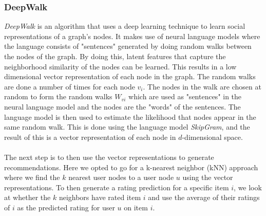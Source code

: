\subsubsection{DeepWalk}
\textit{DeepWalk} is an algorithm that uses a deep learning technique to learn social representations of a graph's nodes\cite{DeepWalk}.
It makes use of neural language models where the language consists of "sentences" generated by doing random walks between the nodes of the graph.
By doing this, latent features that capture the neighborhood similarity of the nodes can be learned.
This results in a low dimensional vector representation of each node in the graph.
The random walks are done a number of times for each node $v_i$.
The nodes in the walk are chosen at random to form the random walks $W_{vi}$ which are used as "sentences" in the neural language model and the nodes are the "words" of the sentences.
The language model is then used to estimate the likelihood that nodes appear in the same random walk.
This is done using the language model \textit{SkipGram}, and the result of this is a vector representation of each node in $d$-dimensional space.
\\\\
The next step is to then use the vector representations to generate recommendations.
Here we opted to go for a k-nearest neighbor (kNN) approach where we find the $k$ nearest user nodes to a user node $u$ using the vector representations.
To then generate a rating prediction for a specific item $i$, we look at whether the $k$ neighbors have rated item $i$ and use the average of their ratings of $i$ as the predicted rating for user $u$ on item $i$.
